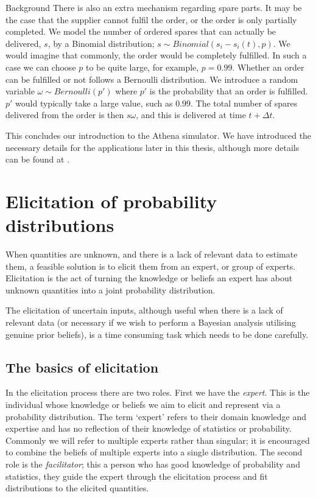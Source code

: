 \begin{chapter}{Background \label{Ch:background}}
There is also an extra mechanism regarding spare parts. It may be the case that the supplier cannot fulfil the order, or the order is only partially completed. We model the number of ordered spares that can actually be delivered, $s$, by a Binomial distribution; $s \sim Binomial(s_i - s_i(t), p)$. We would imagine that commonly, the order would be completely fulfilled. In such a case we can choose $p$ to be quite large, for example, $p = 0.99$. Whether an order can be fulfilled or not follows a Bernoulli distribution. We introduce a random variable $\omega \sim Bernoulli(p')$ where $p'$ is the probability that an order is fulfilled. $p'$ would typically take a large value, such as $0.99$. The total number of spares delivered from the order is then $s\omega$, and this is delivered at time $t + \Delta t$.

This concludes our introduction to the Athena simulator. We have introduced the necessary details for the applications later in this thesis, although more details can be found at \citet{Zit13, Zit16, Zit2021}.

\section{Elicitation of probability distributions \label{sec:prob}}

When quantities are unknown, and there is a lack of relevant data to estimate them, a feasible solution is to elicit them from an expert, or group of experts. Elicitation is the act of turning the knowledge or beliefs an expert has about unknown quantities into a joint probability distribution.

The elicitation of uncertain inputs, although useful when there is a lack of relevant data (or necessary if we wish to perform a Bayesian analysis utilising genuine prior beliefs), is a time consuming task which needs to be done carefully.

\subsection{The basics of elicitation}
In the elicitation process there are two roles. First we have the \textit{expert}. This is the individual whose knowledge or beliefs we aim to elicit and represent via a probability distribution. The term `expert' refers to their domain knowledge and expertise and has no reflection of their knowledge of statistics or probability. Commonly we will refer to multiple experts rather than singular; it is encouraged to combine the beliefs of multiple experts into a single distribution. The second role is the \textit{facilitator}; this a person who has good knowledge of probability and statistics, they guide the expert through the elicitation process and fit distributions to the elicited quantities.


\end{chapter}
